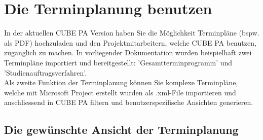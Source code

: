 
\pagebreak	
\section{Die Terminplanung benutzen}
\label{bkm:Ref445400921}
In der aktuellen CUBE PA Version haben Sie die Möglichkeit Terminpläne (bspw. als PDF) hochzuladen und den Projektmitarbeitern, welche CUBE PA benutzen, zugänglich zu machen. In vorliegender Dokumentation wurden beispielhaft zwei Terminpläne importiert und bereitgestellt: 'Gesamtterminprogramm' und 'Studienauftragsverfahren'. \\
Als zweite Funktion der Terminplanung können Sie komplexe Terminpläne, welche mit Microsoft Project erstellt wurden als .xml-File importieren und anschliessend in CUBE PA filtern und benutzerspezifische Ansichten generieren.


\subsection{Die gewünschte Ansicht der Terminplanung}

